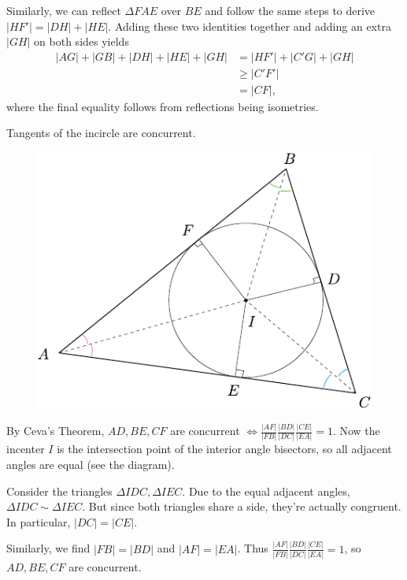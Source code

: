 \documentclass[twoside,10pt]{article}
\begin{document}
Similarly, we can reflect $\Delta FAE$ over $BE$ and follow the same steps to derive $|HF'| = |DH| + |HE|$. Adding these two identities together and adding an extra $|GH|$ on both sides yields
\begin{align*}
	|AG|+|GB|+|DH|+|HE|+|GH| &= |HF'|+|C'G|+|GH| \\
				 &\geq |C'F'| \\
				 &= |CF|,
\end{align*}
where the final equality follows from reflections being isometries.

\newpage

\begin{exer}[1.125]
Tangents of the incircle are concurrent.
\end{exer}

\begin{figure}[H]
	\centering
	\includegraphics[scale=1]{fig/125.pdf}
\end{figure}

By Ceva's Theorem, $AD,BE,CF$ are concurrent $\iff \frac{|AF|}{|FB|} \frac{|BD|}{|DC|} \frac{|CE|}{|EA|} =1$. Now the incenter $I$ is the intersection point of the interior angle bisectors, so all adjacent angles are equal (see the diagram).

	Consider the triangles $\Delta IDC,\Delta IEC$. Due to the equal adjacent angles, $\Delta IDC \sim \Delta IEC$. But since both triangles share a side, they're actually congruent. In particular, $|DC|=|CE|$.

	Similarly, we find $|FB|=|BD|$ and $|AF|=|EA|$. Thus $\frac{|AF|}{|FB|} \frac{|BD|}{|DC|} \frac{|CE|}{|EA|} =1$, so $AD,BE,CF$ are concurrent.
\end{document}
